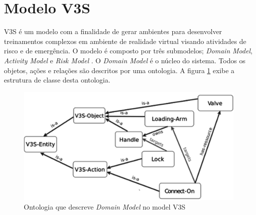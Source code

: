 \section{Modelo V3S}

V3S é um modelo com a finalidade de gerar ambientes para desenvolver treinamentos complexos em ambiente de realidade virtual visando atividades
de risco e de emergência. O modelo é composto por três submodelos; \textit{Domain Model}, \textit{Activity Model} e \textit{Risk Model} 
\cite{v3sframework}. O \textit{Domain Model} é o núcleo do sistema. Todos os objetos, ações e relações são descritos por uma ontologia. 
A figura \ref{domainmodel} exibe a estrutura de classe desta ontologia.

\begin{figure}[H]
  \centering
  \includegraphics[width=0.5\linewidth]{figure/ontologyv3.png} 
  \caption{Ontologia que descreve \textit{Domain Model} no model V3S \cite{v3sframework}}
  \label{domainmodel}
\end{figure}

